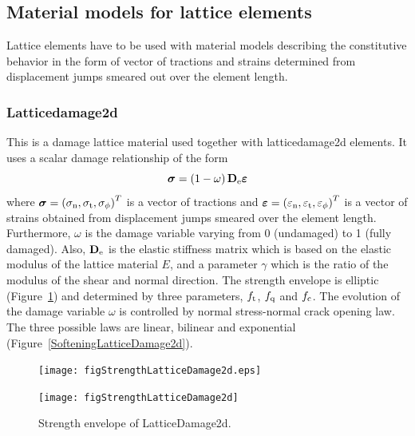 \documentclass[a4paper]{article}
\begin{document}
\subsection{Material models for lattice elements}

Lattice elements have to be used with material models describing the constitutive behavior in the form of vector of  tractions and strains determined from displacement jumps smeared out over the element length.

\subsubsection{Latticedamage2d}
This is a damage lattice material used together with latticedamage2d elements.
It uses a scalar damage relationship of the form
\begin{equation}
\boldsymbol{\sigma} = \left(1-\omega\right) \mathbf{D}_{\rm e} \boldsymbol{\varepsilon}
\end{equation}
where $\boldsymbol{\sigma} = \left( \sigma_{\rm n}, \sigma_{\rm t}, \sigma_{\rm \phi}\right)^{T}$ is a vector of tractions and $\boldsymbol{\varepsilon} = \left( \varepsilon_{\rm n}, \varepsilon_{\rm t}, \varepsilon_{\rm \phi}\right)^{T}$ is a vector of strains obtained from displacement jumps smeared over the element length.
Furthermore, $\omega$ is the damage variable varying from 0 (undamaged) to 1 (fully damaged). 
Also, $\mathbf{D}_{\rm e}$ is the elastic stiffness matrix which is based on the elastic modulus of the lattice material $E$, and a parameter $\gamma$ which is the ratio of the modulus of the shear and normal direction.
The strength envelope is elliptic (Figure~\ref{StrengthLatticeDamage2d}) and determined by three  parameters, $f_{\rm t}$, $f_{\rm q}$ and $f_{\rm c}$. The evolution of the damage variable $\omega$ is controlled by normal stress-normal crack opening law. The three possible laws are linear, bilinear and exponential (Figure~\ref{SofteningLatticeDamage2d}).

\begin{figure}[!htb]
\begin{htmlonly}
  \centerline{\texttt{[image: figStrengthLatticeDamage2d.eps]}}
\end{htmlonly}
 \centerline{\texttt{[image: figStrengthLatticeDamage2d]}}
  \caption{Strength envelope of LatticeDamage2d.}
  \label{StrengthLatticeDamage2d}
\end{figure}
\end{document}
